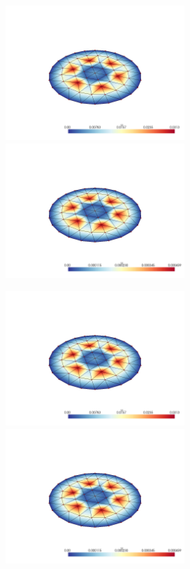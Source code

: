 \documentclass[
  11pt,
]{article}
\let\origfigure\figure
\let\endorigfigure\endfigure
\renewenvironment{figure}[1][2] {
    \expandafter\origfigure\expandafter[H]
} {
    \endorigfigure
}
\begin{document}
\begin{figure}
\caption{Finite element error in the L2 and H1 norms/seminorms, respectively for problem 1 over mesh number 1 using order 5 quadrature.}
\end{figure}

\includegraphics[width=0.5\textwidth,height=\textheight]{../img/mesh1-gauss08-b-L2.png}
\includegraphics[width=0.5\textwidth,height=\textheight]{../img/mesh1-gauss08-b-H1.png}

\begin{figure}
\caption{Finite element error in the L2 and H1 norms/seminorms, respectively for problem 1 over mesh number 1 using order 8 quadrature.}
\end{figure}

\includegraphics[width=0.5\textwidth,height=\textheight]{../img/mesh1-gauss13-b-L2.png}
\includegraphics[width=0.5\textwidth,height=\textheight]{../img/mesh1-gauss13-b-H1.png}
\end{document}
